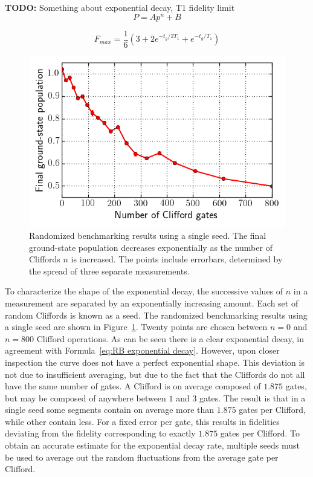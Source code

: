       \textbf{TODO:} Something about exponential decay, T1 fidelity limit
      \begin{equation}
        P= A p^n + B
        \label{eq:RB exponential decay}
      \end{equation}

      \begin{equation}
        F_{max} = \frac{1}{6}\left(3 + 2 e^{-t_g/2 T_1} + e^{-t_g/T_1}\right)
        \label{eq:RB T1 fidelity limit}
      \end{equation}

      \begin{figure}[tb]
        \centering
        \includegraphics[width=.6\textwidth]{../Figures/Randomized benchmarking/RB_single_seed.png}
        \caption{Randomized benchmarking results using a single seed. The final ground-state population decreases exponentially as the number of Cliffords $n$ is increased. The points include errorbars, determined by the spread of three separate measurements.}
        \label{fig:RB single seed}
      \end{figure}

      To characterize the shape of the exponential decay, the successive values of $n$ in a measurement are separated by an exponentially increasing amount. Each set of random Cliffords is known as a seed. The randomized benchmarking results using a single seed are shown in Figure~\ref{fig:RB single seed}. Twenty points are chosen between $n=0$ and $n=800$ Clifford operations. As can be seen there is a clear exponential decay, in agreement with Formula~\ref{eq:RB exponential decay}. However, upon closer inspection the curve does not have a perfect exponential shape. This deviation is not due to insufficient averaging, but due to the fact that the Cliffords do not all have the same number of gates. A Clifford is on average composed of $1.875$ gates, but may be composed of anywhere between $1$ and $3$ gates. The result is that in a single seed some segments contain on average more than $1.875$ gates per Clifford, while other contain less. For a fixed error per gate, this results in fidelities deviating from the fidelity corresponding to exactly $1.875$ gates per Clifford. To obtain an accurate estimate for the exponential decay rate, multiple seeds must be used to average out the random fluctuations from the average gate per Clifford.

